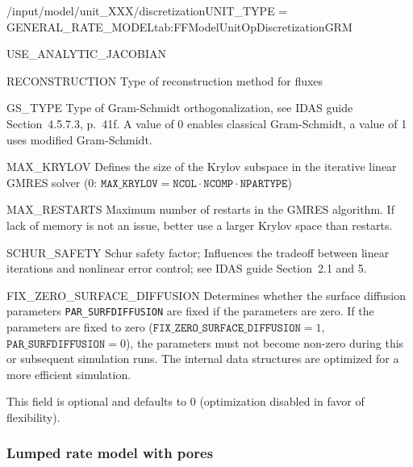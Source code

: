 \begin{condsubgroup}{/input/model/unit\_XXX/discretization}{UNIT\_TYPE = GENERAL\_RATE\_MODEL}{tab:FFModelUnitOpDiscretizationGRM}
\begin{dataset}[type=int,range={$\{0, 1\}$},length=1]{USE\_ANALYTIC\_JACOBIAN}
  \end{dataset}
  \begin{dataset}[type=string,range={\texttt{WENO}},length={1}]{RECONSTRUCTION}
    Type of reconstruction method for fluxes
  \end{dataset}
  \begin{dataset}[type=int,range={$\{0, 1\}$},length=1]{GS\_TYPE}
    Type of Gram-Schmidt orthogonalization, see IDAS guide Section~4.5.7.3, p.~41f.
    A value of $0$ enables classical Gram-Schmidt, a value of 1 uses modified Gram-Schmidt.
  \end{dataset}
  \begin{dataset}[type=int,range={$\{0, \dots, \texttt{NCOL} \cdot \texttt{NCOMP} \cdot \texttt{NPARTYPE} \}$},length=1]{MAX\_KRYLOV}
    Defines the size of the Krylov subspace in the iterative linear GMRES solver (0: $\texttt{MAX\_KRYLOV} = \texttt{NCOL} \cdot \texttt{NCOMP} \cdot \texttt{NPARTYPE}$)
  \end{dataset}
  \begin{dataset}[type=int,range={$\geq 0$},length=1]{MAX\_RESTARTS}
    Maximum number of restarts in the GMRES algorithm. If lack of memory is not an issue, better use a larger Krylov space than restarts.
  \end{dataset}
  \begin{dataset}[type=double,range={$\geq 0$},length=1]{SCHUR\_SAFETY}
    Schur safety factor; Influences the tradeoff between linear iterations and nonlinear error control; see IDAS guide Section~2.1 and 5.
  \end{dataset}
  \begin{dataset}[type=int,range={$\{0, 1\}$},length=1]{FIX\_ZERO\_SURFACE\_DIFFUSION}
    Determines whether the surface diffusion parameters \texttt{PAR\_SURFDIFFUSION} are fixed if the parameters are zero.
    If the parameters are fixed to zero ($\texttt{FIX\_ZERO\_SURFACE\_DIFFUSION} = 1$, $\texttt{PAR\_SURFDIFFUSION} = 0$), the parameters must not become non-zero during this or subsequent simulation runs.
    The internal data structures are optimized for a more efficient simulation.

    This field is optional and defaults to $0$ (optimization disabled in favor of flexibility).
  \end{dataset}
\end{condsubgroup}

\subsubsection{Lumped rate model with pores}

